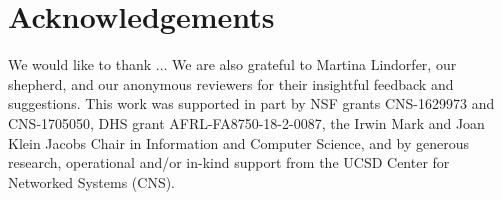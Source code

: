 \section*{Acknowledgements}

We would like to thank ...  We are also grateful to Martina Lindorfer,
our shepherd, and our anonymous reviewers for their insightful
feedback and suggestions.  This work was supported in part by NSF
grants CNS-1629973 and CNS-1705050, DHS grant AFRL-FA8750-18-2-0087,
the Irwin Mark and Joan Klein Jacobs Chair in Information and Computer
Science, and by generous research, operational and/or in-kind support
from the UCSD Center for Networked Systems (CNS).
